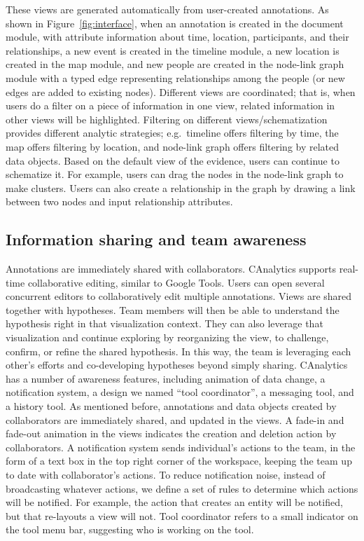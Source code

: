 These views are generated automatically from user-created annotations. As shown in Figure~\ref{fig:interface}, when an annotation is created in the
document module, with attribute information about time, location, participants, and their
relationships, a new event is created in the timeline module, a new location is
created in the map module, and new people are created in the node-link graph
module with a typed edge representing relationships among the people (or new
edges are added to existing nodes). Different views are coordinated; that is,
when users do a filter on a piece of information in one view, related
information in other views will be highlighted. Filtering on different
views/schematization provides different analytic strategies; e.g. timeline
offers filtering by time, the map offers filtering by location, and node-link graph
offers filtering by related data objects. Based on the default view of the evidence,
users can continue to schematize it. For example, users can drag the nodes in
the node-link graph to make clusters. Users can also create a relationship in
the graph by drawing a link between two nodes and input relationship attributes.


\subsection{Information sharing and team awareness}

Annotations are immediately shared with collaborators. CAnalytics supports
real-time collaborative editing, similar to Google Tools. Users can open
several concurrent editors to collaboratively edit multiple annotations. Views
are shared together with hypotheses. Team members will then be able to
understand the hypothesis right in that visualization context. They can also
leverage that visualization and continue exploring by reorganizing the view, to
challenge, confirm, or refine the shared hypothesis. In this way, the team is
leveraging each other’s efforts and co-developing hypotheses beyond simply
sharing. CAnalytics has a number of awareness features, including animation of
data change, a notification system, a design we named “tool coordinator”, a
messaging tool, and a history tool. As mentioned before, annotations and data
objects created by collaborators are immediately shared, and updated in the
views. A fade-in and fade-out  animation in the views indicates the creation
and deletion action by collaborators. A notification system sends individual’s
actions to the team, in the form of a text box in the top right corner of the
workspace, keeping the team up to date with collaborator’s actions. To reduce
notification noise, instead of broadcasting whatever actions, we define a set of
rules to determine which actions will be notified. For example, the action that
creates an entity will be notified, but that re-layouts a view will not. Tool
coordinator refers to a small indicator on the tool menu bar, suggesting who is
working on the tool.

